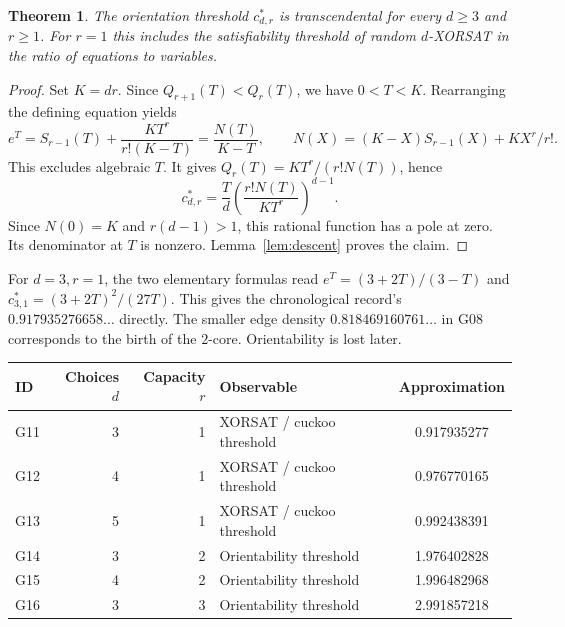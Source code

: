 \documentclass[11pt,a4paper]{article}
\newtheorem{theorem}{Theorem}[section]
\theoremstyle{definition}
\theoremstyle{remark}
\begin{document}
\par\hypertarget{cat-G11}{}\label{page:G11}\hypertarget{cat-G12}{}\label{page:G12}\hypertarget{cat-G13}{}\label{page:G13}\hypertarget{cat-G14}{}\label{page:G14}\hypertarget{cat-G15}{}\label{page:G15}\hypertarget{cat-G16}{}\label{page:G16}
\begin{theorem}\label{thm:gorient}
The orientation threshold $c^*_{d,r}$ is transcendental for every
$d\ge3$ and $r\ge1$. For $r=1$ this includes the satisfiability threshold of
random $d$-XORSAT in the ratio of equations to variables.
\end{theorem}
\begin{proof}
Set $K=dr$. Since $Q_{r+1}(T)<Q_r(T)$, we have $0<T<K$.
Rearranging the defining equation yields
\[
   e^T=S_{r-1}(T)+\frac{K T^r}{r!(K-T)}
       =\frac{N(T)}{K-T},\qquad
 N(X)=(K-X)S_{r-1}(X)+KX^r/r! .
\]
This excludes algebraic $T$. It gives $Q_r(T)=KT^r/(r!N(T))$, hence
\[
 c^*_{d,r}=\frac{T}{d}
 \left(\frac{r!N(T)}{KT^r}\right)^{d-1}.
\]
Since $N(0)=K$ and $r(d-1)>1$, this rational function has a pole at
zero. Its denominator at $T$ is nonzero. Lemma~\ref{lem:descent} proves the claim.
\end{proof}

For $d=3,r=1$, the two elementary formulas read
$e^T=(3+2T)/(3-T)$ and $c^*_{3,1}=(3+2T)^2/(27T)$.
This gives the chronological record's $0.917935276658\ldots$ directly.
The smaller edge density $0.818469160761\ldots$ in G08 corresponds to
the birth of the $2$-core. Orientability is lost later.

\begin{center}\small
\begin{tabular}{@{}lrrlc@{}}\toprule
ID & Choices $d$ & Capacity $r$ & Observable & Approximation\\\midrule
G11 & 3&1& XORSAT / cuckoo threshold & 0.917935277\\
G12 & 4&1& XORSAT / cuckoo threshold & 0.976770165\\
G13 & 5&1& XORSAT / cuckoo threshold & 0.992438391\\
G14 & 3&2& Orientability threshold & 1.976402828\\
G15 & 4&2& Orientability threshold & 1.996482968\\
G16 & 3&3& Orientability threshold & 2.991857218\\
\bottomrule\end{tabular}
\end{center}
\end{document}
